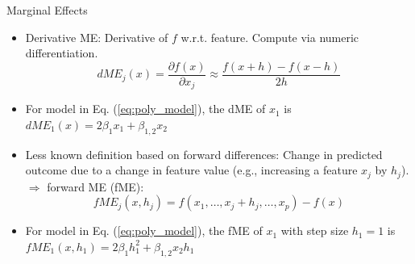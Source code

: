 \documentclass[11pt,compress,t,notes=noshow, aspectratio=169, xcolor=table]{beamer}
\begin{document}
\begin{frame}{Marginal Effects}

\begin{itemize}
\item
Derivative ME: Derivative of $f$ w.r.t. feature. Compute via numeric differentiation.
$$dME_j(x) = \frac{\partial f(x)}{\partial x_j} \approx \frac{f(x + h) - f(x - h)}{2h}$$
\item For model in Eq. (\ref{eq:poly_model}), the dME of $x_1$ is $dME_1(x) = 2\beta_1 x_1 +  \beta_{1, 2} x_2$
\item Less known definition based on forward differences: Change in predicted outcome due to a change in feature value (e.g., increasing a feature $x_j$ by $h_j$). $\Rightarrow$ forward ME (fME):
\begin{equation*}
fME_j(x, h_j) = f(x_1, \dots, x_j + h_j, \dots, x_p) - f(x)
\end{equation*}
\item For model in Eq. (\ref{eq:poly_model}), the fME of $x_1$ with step size $h_1 = 1$ is
$fME_1(x, h_1) = 2\beta_1 h_1^2 +  \beta_{1, 2} x_2 h_1$
\end{itemize}
\end{frame}


\end{document}
